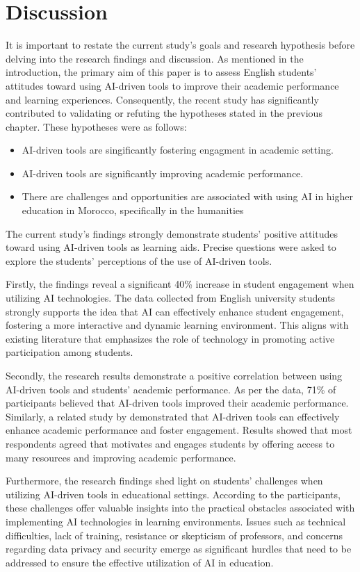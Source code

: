 \section{Discussion}
It is important to restate the current study's goals and research 
hypothesis before delving into the research findings and discussion.
As mentioned in the introduction, the primary aim of this paper is 
to assess English students' attitudes toward using AI-driven tools
to improve their academic performance and learning experiences. 
Consequently, the recent study has significantly contributed to 
validating or refuting the hypotheses stated in the previous chapter. 
These hypotheses were as follows:
\begin{itemize}
	\item AI-driven tools are singificantly fostering engagment in academic setting.
	\item AI-driven tools are significantly improving academic performance.
	\item There are challenges and opportunities are associated with using AI in higher education
	      in Morocco, specifically in the humanities
\end{itemize}
The current study's findings strongly demonstrate students' positive 
attitudes toward using AI-driven tools as learning aids. 
Precise questions were asked to explore the students' perceptions of the use of AI-driven tools.

Firstly, the findings reveal a significant 40\% 
increase in student engagement when utilizing AI technologies. 
The data collected from English university students strongly 
supports the idea that AI can effectively enhance student engagement, 
fostering a more interactive and dynamic learning environment. 
This aligns with existing literature that emphasizes 
the role of technology in promoting active participation among students.


Secondly, the research results demonstrate a positive correlation 
between using AI-driven tools and students' academic performance. 
As per the data, 71\% of participants believed that AI-driven tools improved their academic performance.
Similarly, a related study by \citep{mohammed_exploring_2023} demonstrated 
that AI-driven tools can effectively enhance academic performance and foster engagement. 
Results showed that most respondents agreed that  motivates and 
engages students by offering access to many resources and improving academic performance.


Furthermore, the research findings shed light on students' challenges 
when utilizing AI-driven tools in educational settings. According to
the participants, these challenges offer valuable insights into the
practical obstacles associated with implementing AI technologies in
learning environments. Issues such as technical difficulties, lack
of training, resistance or skepticism of professors, and concerns
regarding data privacy and security emerge as significant hurdles
that need to be addressed to ensure the effective utilization of AI in education.


